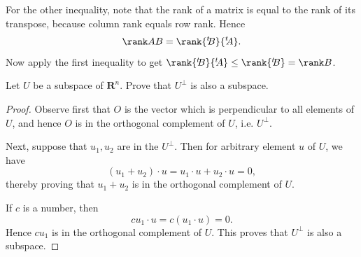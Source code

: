 {{\begin{Solution}
        For the other inequality, note that the rank of a matrix is equal to the rank of its transpose, because column rank equals row rank. 
        Hence 
        \begin{equation*}
            \rank AB = \rank {^{t\!\!}B} {^{t\!\!}A}.
        \end{equation*}
        Now apply the first inequality to get $\rank {^{t\!\!}B} {^{t\!\!}A} \leq \rank {^{t\!\!}B} = \rank B$. 
    \end{Solution}
    \item 
    Let $U$ be a subspace of $\mathbf{R}^n$. 
    Prove that $U^{\perp}$ is also a subspace. 
    \begin{solution}
        \begin{proof}
            Observe first that $O$ is the vector which is perpendicular to all elements of $U$, and hence $O$ is in the orthogonal complement of $U$, i.e. $U^{\perp}$. 

            Next, suppose that $u_1, u_2$ are in the $U^{\perp}$. 
            Then for arbitrary element $u$ of $U$, we have 
            \begin{equation*}
                (u_1 + u_2 ) \cdot u = u_1 \cdot u + u_2 \cdot u = 0, 
            \end{equation*}
            thereby proving that $u_1 + u_2$ is in the orthogonal complement of $U$. 

            If $c$ is a number, then 
            \begin{equation*}
                cu_1 \cdot u = c(u_1 \cdot u) = 0. 
            \end{equation*}
            Hence $cu_1$ is in the orthogonal complement of $U$. 
            This proves that $U^{\perp}$ is also a subspace. 
        \end{proof}
    \end{solution}
}}
